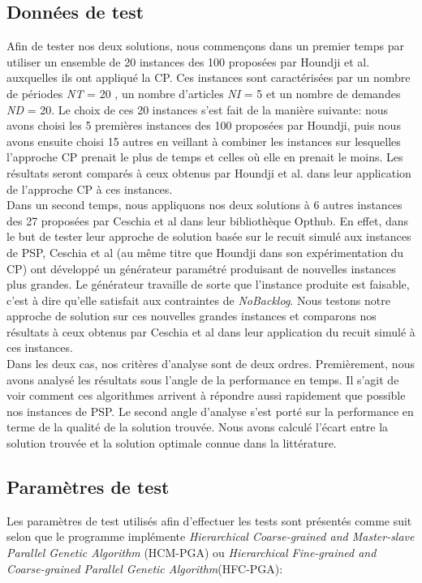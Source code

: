 	\subsection*{Données de test}
Afin de tester nos deux solutions, nous commençons dans un premier temps par utiliser un ensemble de 20 instances des 100 proposées par Houndji et al. \cite{houndji_thesis} auxquelles ils ont appliqué la CP. Ces instances sont caractérisées par un nombre de périodes \emph{NT} = 20 , un nombre d'articles \emph{NI} = 5 et un nombre de demandes \emph{ND} = 20. Le choix de ces 20 instances s'est fait de la manière suivante: nous avons choisi les 5 premières instances des 100 proposées par Houndji, puis nous avons ensuite choisi 15 autres en veillant à combiner les instances sur lesquelles l'approche CP prenait le plus de temps et celles où elle en prenait le moins. Les résultats seront comparés à ceux obtenus par Houndji et al. dans leur application de l'approche CP à ces instances. \\
		\hspace*{.5cm} Dans un second temps, nous appliquons nos deux solutions à 6 autres instances des 27 proposées par Ceschia et al \cite{ceschia} dans leur bibliothèque Opthub. En effet, dans le but de tester leur approche de solution basée sur le recuit simulé aux instances de PSP, Ceschia et al (au même titre que Houndji dans son expérimentation du CP) ont  développé un générateur paramétré produisant de nouvelles instances plus grandes. Le générateur travaille de sorte que l'instance produite est faisable, c'est à dire qu'elle satisfait aux contraintes de \emph{NoBacklog}. Nous testons notre approche de solution sur ces nouvelles grandes instances et comparons nos résultats à ceux obtenus par Ceschia et al dans leur application du recuit simulé à ces instances. \\
		\hspace*{.5cm} Dans les deux cas, nos critères d'analyse sont de deux ordres. Premièrement, nous avons analysé les résultats sous l'angle de la performance en temps. Il s'agit de voir comment ces algorithmes arrivent à répondre aussi rapidement que possible nos instances de PSP.  Le second angle d'analyse s'est porté sur la performance en terme de la qualité de la solution trouvée. Nous avons calculé l'écart entre la solution trouvée et la solution optimale connue dans la littérature.
		
		\subsection*{Paramètres de test}
		Les paramètres de test utilisés afin d'effectuer les tests sont présentés comme suit selon que le programme implémente \emph{Hierarchical Coarse-grained and Master-slave Parallel Genetic Algorithm} (HCM-PGA) ou \emph{Hierarchical Fine-grained and Coarse-grained Parallel Genetic Algorithm}(HFC-PGA):

